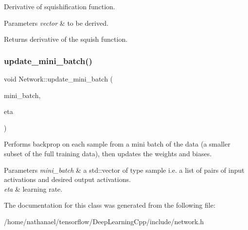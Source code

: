 Derivative of squishification function.


\begin{DoxyParams}{Parameters}
{\em vector} & to be derived. \\
\hline
\end{DoxyParams}
\begin{DoxyReturn}{Returns}
derivative of the squish function. 
\end{DoxyReturn}
\mbox{\label{classNetwork_af736bbf264f09be714d5961ef670a5cb}} 
\subsubsection{\texorpdfstring{update\+\_\+mini\+\_\+batch()}{update\_mini\_batch()}}
{\footnotesize\ttfamily void Network\+::update\+\_\+mini\+\_\+batch (\begin{DoxyParamCaption}\item[{std\+::vector$<$ sample $>$ \&}]{mini\+\_\+batch,  }\item[{int}]{eta }\end{DoxyParamCaption})}

Performs backprop on each sample from a mini batch of the data (a smaller subset of the full training data), then updates the weights and biases.


\begin{DoxyParams}{Parameters}
{\em mini\+\_\+batch} & a std\+::vector of type sample i.\+e. a list of pairs of input activations and desired output activations.\\
\hline
{\em eta} & learning rate. \\
\hline
\end{DoxyParams}


The documentation for this class was generated from the following file\+:\begin{DoxyCompactItemize}
\item 
/home/nathanael/tensorflow/\+Deep\+Learning\+Cpp/include/network.\+h\end{DoxyCompactItemize}
